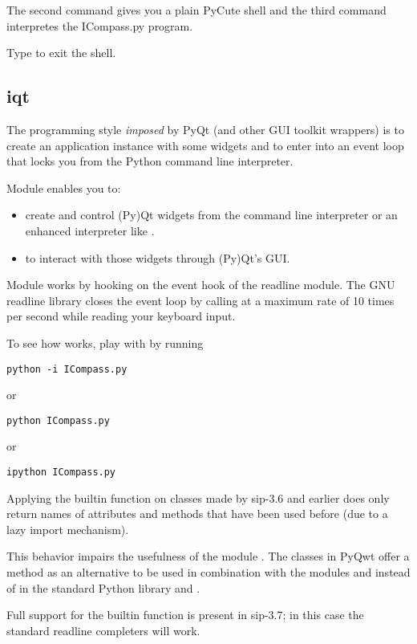 \documentclass{manual}
\begin{document}
The second command gives you a plain PyCute shell and the third command 
interpretes the ICompass.py program.

Type  to exit the shell.
 

\subsection{iqt \label{iqt-intro}}

The programming style \emph{imposed} by PyQt (and other GUI toolkit wrappers)
is to create an application instance with some widgets and to enter into an
event loop that locks you from the Python command line interpreter.

Module  enables you to:
\begin{itemize}
\item
  create and control (Py)Qt widgets from the command line interpreter or an
  enhanced interpreter like .
\item
  to interact with those widgets through (Py)Qt's GUI.
\end{itemize}

Module  works by hooking  on the
event hook of the readline module.
The GNU readline library closes the event loop by calling 
 at a maximum rate of 10 times per second
while reading your keyboard input.

To see how  works, play with  by running
\begin{verbatim}
python -i ICompass.py
\end{verbatim}
or
\begin{verbatim}
python ICompass.py
\end{verbatim}
or
\begin{verbatim}
ipython ICompass.py
\end{verbatim}

\begin{notice}[warning]
  Applying the builtin function  on classes made by sip-3.6
  and earlier does only return names of attributes and methods that have
  been used before (due to a lazy import mechanism).

  This behavior impairs the usefulness of the module .
  The classes in PyQwt offer a method  as an
  alternative to be used in combination with the modules
   and  instead of
   in the standard Python library and
  .

  Full support for the builtin function  is present in
  sip-3.7; in this case the standard readline completers will work. 
\end{notice}
\end{document}
